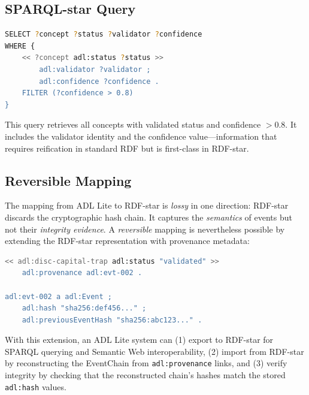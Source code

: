 \subsection{SPARQL-star Query}

\begin{lstlisting}[language=bash]
SELECT ?concept ?status ?validator ?confidence
WHERE {
    << ?concept adl:status ?status >>
        adl:validator ?validator ;
        adl:confidence ?confidence .
    FILTER (?confidence > 0.8)
}
\end{lstlisting}

This query retrieves all concepts with validated status and confidence $> 0.8$. It includes the validator identity and the confidence value---information that requires reification in standard RDF but is first-class in RDF-star.

\subsection{Reversible Mapping}

The mapping from ADL Lite to RDF-star is \emph{lossy} in one direction: RDF-star discards the cryptographic hash chain. It captures the \emph{semantics} of events but not their \emph{integrity evidence}. A \emph{reversible} mapping is nevertheless possible by extending the RDF-star representation with provenance metadata:

\begin{lstlisting}[language=bash]
<< adl:disc-capital-trap adl:status "validated" >>
    adl:provenance adl:evt-002 .

adl:evt-002 a adl:Event ;
    adl:hash "sha256:def456..." ;
    adl:previousEventHash "sha256:abc123..." .
\end{lstlisting}

With this extension, an ADL Lite system can (1) export to RDF-star for SPARQL querying and Semantic Web interoperability, (2) import from RDF-star by reconstructing the EventChain from \texttt{adl:provenance} links, and (3) verify integrity by checking that the reconstructed chain's hashes match the stored \texttt{adl:hash} values.
